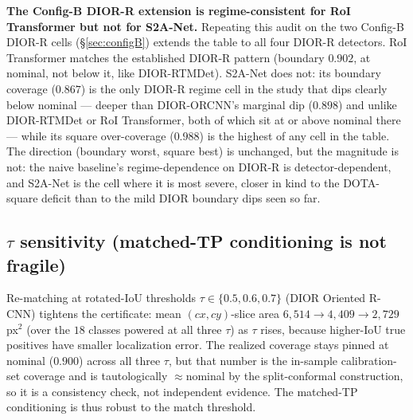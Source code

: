 \documentclass[11pt]{article}
\begin{document}
\textbf{The Config-B DIOR-R extension is regime-consistent for RoI Transformer but not for S2A-Net.}
Repeating this audit on the two Config-B DIOR-R cells (\S\ref{sec:configB}) extends the table to all four
DIOR-R detectors. RoI Transformer matches the established DIOR-R pattern (boundary $0.902$, at nominal, not
below it, like DIOR-RTMDet). S2A-Net does not: its boundary coverage ($0.867$) is the only DIOR-R regime cell
in the study that dips clearly below nominal --- deeper than DIOR-ORCNN's marginal dip ($0.898$) and unlike
DIOR-RTMDet or RoI Transformer, both of which sit at or above nominal there --- while its square
over-coverage ($0.988$) is the highest of any cell in the table. The direction (boundary worst, square best)
is unchanged, but the magnitude is not: the naive baseline's regime-dependence on DIOR-R is
detector-dependent, and S2A-Net is the cell where it is most severe, closer in kind to the DOTA-square
deficit than to the mild DIOR boundary dips seen so far.

\subsection{$\tau$ sensitivity (matched-TP conditioning is not fragile)}
Re-matching at rotated-IoU thresholds $\tau\in\{0.5,0.6,0.7\}$ (DIOR Oriented R-CNN) tightens the
certificate: mean $(cx,cy)$-slice area $6{,}514\to4{,}409\to2{,}729$\,px$^2$ (over the $18$ classes
powered at all three $\tau$) as $\tau$ rises, because higher-IoU true positives have smaller localization
error. The realized coverage stays pinned at nominal ($0.900$) across all three $\tau$, but that number is
the in-sample calibration-set coverage and is tautologically $\approx$nominal by the split-conformal
construction, so it is a consistency check, not independent evidence. The matched-TP conditioning is thus
robust to the match threshold.
\end{document}

